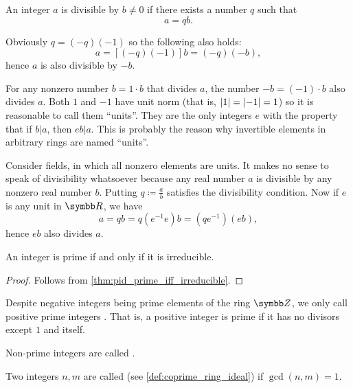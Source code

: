 \begin{remark}\label{remark:units_in_rings_etymology}
  An integer \( a \) is divisible by \( b \neq 0 \) if there exists a number \( q \) such that
  \begin{equation*}
    a = qb.
  \end{equation*}

  Obviously \( q = (-q)(-1) \) so the following also holds:
  \begin{equation*}
    a = [(-q)(-1)]b = (-q)(-b),
  \end{equation*}
  hence \( a \) is also divisible by \( -b \).

  For any nonzero number \( b = 1 \cdot b \) that divides \( a \), the number \( -b = (-1) \cdot b \) also divides \( a \). Both \( 1 \) and \( -1 \) have unit norm (that is, \( \left\vert 1 \right\vert = \left\vert -1 \right\vert = 1 \)) so it is reasonable to call them \enquote{units}. They are the only integers \( e \) with the property that if \( b | a \), then \( eb | a \). This is probably the reason why invertible elements in arbitrary rings are named \enquote{units}.

  Consider fields, in which all nonzero elements are units. It makes no sense to speak of divisibility whatsoever because any real number \( a \) is divisible by any nonzero real number \( b \). Putting \( q \coloneqq \frac a b \) satisfies the divisibility condition. Now if \( e \) is any unit in \( \R \), we have
  \begin{equation*}
    a = qb = q(e^{-1} e) b = (qe^{-1}) (eb),
  \end{equation*}
  hence \( eb \) also divides \( a \).
\end{remark}

\begin{lemma}\label{thm:euclids_lemma}
  An integer is prime if and only if it is irreducible.
\end{lemma}
\begin{proof}
  Follows from \cref{thm:pid_prime_iff_irreducible}.
\end{proof}

\begin{definition}\label{def:prime_number}
  Despite negative integers being prime elements of the ring \( \Z \), we only call positive prime integers . That is, a positive integer is prime if it has no divisors except \( 1 \) and itself.

  Non-prime integers are called .

  Two integers \( n, m \) are called  (see \cref{def:coprime_ring_ideal}) if \( \gcd(n, m) = 1 \).
\end{definition}

